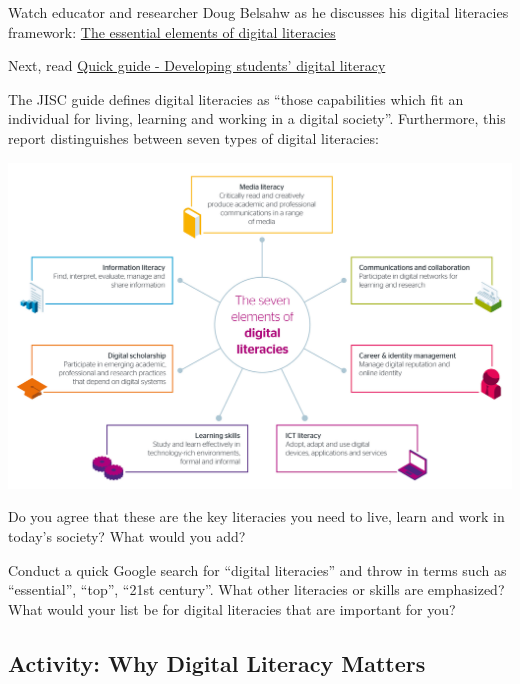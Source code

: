 \documentclass[
]{book}
\theoremstyle{definition}
\theoremstyle{definition}
\theoremstyle{definition}
\theoremstyle{definition}
\theoremstyle{remark}
\begin{document}
\begin{reflect}
Watch educator and researcher Doug Belsahw as he discusses his digital literacies framework: \href{https://www.youtube.com/watch?v=A8yQPoTcZ78}{The essential elements of digital literacies}

Next, read \href{https://digitalcapability.jiscinvolve.org/wp/files/2014/09/JISC_REPORT_Digital_Literacies_280714_PRINT.pdf}{Quick guide - Developing students' digital literacy}

The JISC guide defines digital literacies as ``those capabilities which fit an individual for living, learning and working in a digital society''. Furthermore, this report distinguishes between seven types of digital literacies:

\includegraphics{assets/u1/7-digital-literacy-elements.png}

Do you agree that these are the key literacies you need to live, learn and work in today's society? What would you add?

Conduct a quick Google search for ``digital literacies'' and throw in terms such as ``essential'', ``top'', ``21st century''. What other literacies or skills are emphasized? What would your list be for digital literacies that are important for you?
\end{reflect}

\hypertarget{activity-why-digital-literacy-matters}{%
\subsection*{Activity: Why Digital Literacy Matters}\label{activity-why-digital-literacy-matters}}
\end{document}
